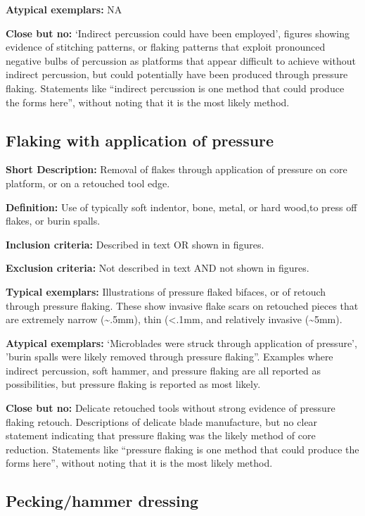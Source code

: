 \documentclass[
]{article}
\begin{document}
\textbf{Atypical exemplars:} NA

\textbf{Close but no:} `Indirect percussion could have been employed',
figures showing evidence of stitching patterns, or flaking patterns that
exploit pronounced negative bulbs of percussion as platforms that appear
difficult to achieve without indirect percussion, but could potentially
have been produced through pressure flaking. Statements like ``indirect
percussion is one method that could produce the forms here'', without
noting that it is the most likely method.

\hypertarget{flaking-with-application-of-pressure}{%
\subsection{Flaking with application of
pressure}\label{flaking-with-application-of-pressure}}

\textbf{Short Description:} Removal of flakes through application of
pressure on core platform, or on a retouched tool edge.

\textbf{Definition:} Use of typically soft indentor, bone, metal, or
hard wood,to press off flakes, or burin spalls.

\textbf{Inclusion criteria:} Described in text OR shown in figures.

\textbf{Exclusion criteria:} Not described in text AND not shown in
figures.

\textbf{Typical exemplars:} Illustrations of pressure flaked bifaces, or
of retouch through pressure flaking. These show invasive flake scars on
retouched pieces that are extremely narrow (\textasciitilde.5mm), thin
(\textless.1mm, and relatively invasive (\textasciitilde5mm).

\textbf{Atypical exemplars:} `Microblades were struck through
application of pressure', 'burin spalls were likely removed through
pressure flaking''. Examples where indirect percussion, soft hammer, and
pressure flaking are all reported as possibilities, but pressure flaking
is reported as most likely.

\textbf{Close but no:} Delicate retouched tools without strong evidence
of pressure flaking retouch. Descriptions of delicate blade manufacture,
but no clear statement indicating that pressure flaking was the likely
method of core reduction. Statements like ``pressure flaking is one
method that could produce the forms here'', without noting that it is
the most likely method.

\hypertarget{peckinghammer-dressing}{%
\subsection{Pecking/hammer dressing}\label{peckinghammer-dressing}}
\end{document}
